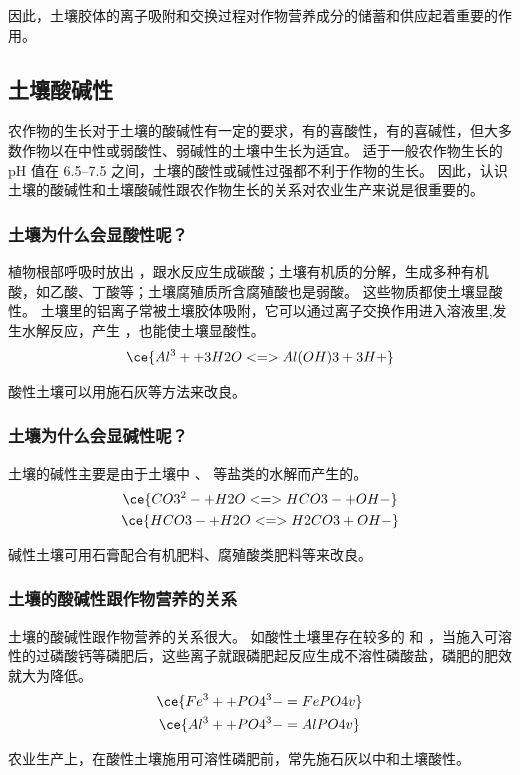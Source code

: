 因此，土壤胶体的离子吸附和交换过程对作物营养成分的储蓄和供应起着重要的作用。

\subsection{土壤酸碱性}
农作物的生长对于土壤的酸碱性有一定的要求，有的喜酸性，有的喜碱性，但大多数作物以在中性或弱酸性、弱碱性的土壤中生长为适宜。
适于一般农作物生长的 pH 值在 \numrange{6.5}{7.5} 之间，土壤的酸性或碱性过强都不利于作物的生长。
因此，认识土壤的酸碱性和土壤酸碱性跟农作物生长的关系对农业生产来说是很重要的。

\subsubsection{土壤为什么会显酸性呢？}
植物根部呼吸时放出 ，跟水反应生成碳酸；土壤有机质的分解，生成多种有机酸，如乙酸、丁酸等；土壤腐殖质所含腐殖酸也是弱酸。
这些物质都使土壤显酸性。
土壤里的铝离子常被土壤胶体吸附，它可以通过离子交换作用进入溶液里,发生水解反应，产生 ，也能使土壤显酸性。
\[ \ce{ Al^3+ + 3H2O <=> Al(OH)3 + 3H+ }\]

酸性土壤可以用施石灰等方法来改良。

\subsubsection{土壤为什么会显碱性呢？}
土壤的碱性主要是由于土壤中 、 等盐类的水解而产生的。
\begin{gather*}
  \ce{ CO3^2- + H2O <=> HCO3- + OH- }\\
  \ce{ HCO3- + H2O <=> H2CO3 + OH- }
\end{gather*}

碱性土壤可用石膏配合有机肥料、腐殖酸类肥料等来改良。

\subsubsection{土壤的酸碱性跟作物营养的关系}
土壤的酸碱性跟作物营养的关系很大。
如酸性土壤里存在较多的  和 ，当施入可溶性的过磷酸钙等磷肥后，这些离子就跟磷肥起反应生成不溶性磷酸盐，磷肥的肥效就大为降低。
\begin{gather*}
  \ce{ Fe^3+ + PO4^3- = FePO4 v}\\
  \ce{ Al^3+ + PO4^3- = AlPO4 v}
\end{gather*}

农业生产上，在酸性土壤施用可溶性磷肥前，常先施石灰以中和土壤酸性。

